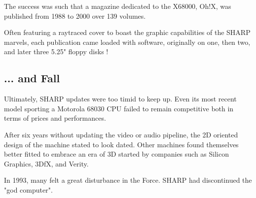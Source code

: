 \begin{trivia}
The success was such that a magazine dedicated to the X68000, Oh!X, was published from 1988 to 2000 over 139 volumes. 

\begin{minipage}[t]{0.32\linewidth}
\end{minipage}%
\hfill
\begin{minipage}[t]{0.32\linewidth}
\end{minipage}%
\hfill
\begin{minipage}[t]{0.322\linewidth}
\end{minipage}%

Often featuring a raytraced cover to boast the graphic capabilities of the SHARP marvels, each publication came loaded with software, originally on one, then two, and later three 5.25" floppy disks \cite{ohXarticle}!
\end{trivia}

\subsection{... and Fall}
Ultimately, SHARP updates were too timid to keep up. Even its most recent model sporting a Motorola 68030 CPU failed to remain competitive both in terms of prices and performances.

After six years without updating the video or audio pipeline, the 2D oriented design of the machine stated to look dated. Other machines found themselves better fitted to embrace an era of 3D started by companies such as Silicon Graphics, 3DfX, and Verity.

In 1993, many felt a great disturbance in the Force. SHARP had discontinued the "god computer".

